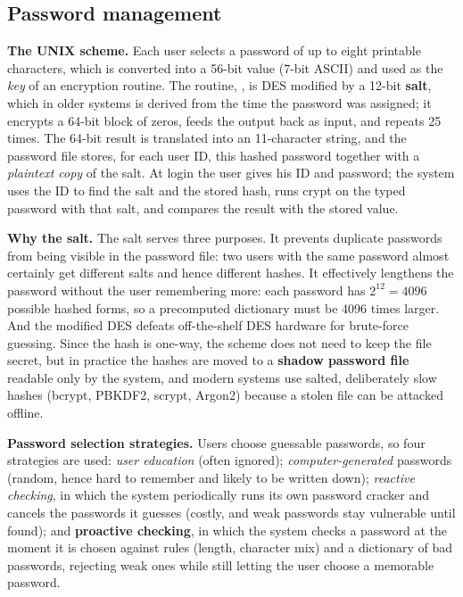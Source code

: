 \subsection{Password management \new}

\textbf{The UNIX scheme.} Each user selects a password of up to eight printable characters, which is converted into a 56-bit value (7-bit ASCII) and used as the \emph{key} of an encryption routine. The routine, , is DES modified by a 12-bit \textbf{salt}, which in older systems is derived from the time the password was assigned; it encrypts a 64-bit block of zeros, feeds the output back as input, and repeats 25 times. The 64-bit result is translated into an 11-character string, and the password file stores, for each user ID, this hashed password together with a \emph{plaintext copy} of the salt. At login the user gives his ID and password; the system uses the ID to find the salt and the stored hash, runs crypt on the typed password with that salt, and compares the result with the stored value.

\textbf{Why the salt.} The salt serves three purposes. It prevents duplicate passwords from being visible in the password file: two users with the same password almost certainly get different salts and hence different hashes. It effectively lengthens the password without the user remembering more: each password has $2^{12} = 4096$ possible hashed forms, so a precomputed dictionary must be 4096 times larger. And the modified DES defeats off-the-shelf DES hardware for brute-force guessing. Since the hash is one-way, the scheme does not need to keep the file secret, but in practice the hashes are moved to a \textbf{shadow password file} readable only by the system, and modern systems use salted, deliberately slow hashes (bcrypt, PBKDF2, scrypt, Argon2) because a stolen file can be attacked offline.

\textbf{Password selection strategies.} Users choose guessable passwords, so four strategies are used: \emph{user education} (often ignored); \emph{computer-generated} passwords (random, hence hard to remember and likely to be written down); \emph{reactive checking}, in which the system periodically runs its own password cracker and cancels the passwords it guesses (costly, and weak passwords stay vulnerable until found); and \textbf{proactive checking}, in which the system checks a password at the moment it is chosen against rules (length, character mix) and a dictionary of bad passwords, rejecting weak ones while still letting the user choose a memorable password.

